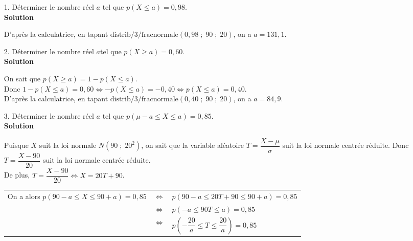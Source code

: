 \begin{itemize}
\item[1.] Déterminer le nombre réel $a$ tel que $p\left(X \leqslant a\right) = 0,98$. \\

\textbf{Solution} 

D'après la calculatrice, en tapant $\mathrm{distrib}/3/\mathrm{fracnormale}\left(0,98 \; ; \; 90 \; ; \; 20\right)$, on a $a = 131,1$. \\

\item[2.] Déterminer le nombre réel $a $tel que $p\left(X \geqslant a\right) = 0,60$. \\

\textbf{Solution} 

On sait que $p\left(X \geqslant a\right) = 1 - p\left(X \leqslant a\right)$. \\

Donc $1 - p\left(X \leqslant a\right) = 0,60 \Longleftrightarrow -p\left(X \leqslant a\right) = -0,40 \Longleftrightarrow p\left(X \leqslant a\right) = 0,40$. \\

D'après la calculatrice, en tapant $\mathrm{distrib}/3/\mathrm{fracnormale}\left(0,40 \; ; \; 90 \; ; \; 20\right)$, on a $a = 84,9$. \\

\item[3.] Déterminer le nombre réel $a$ tel que $p\left(\mu - a\leqslant X \leqslant a\right) = 0,85$. \\

\textbf{Solution} 

Puisque $X$ suit la loi normale $N\left(90 \; ; \; 20^2\right)$, on sait que la variable aléatoire $T = \dfrac{X - \mu}{\sigma}$ suit la loi normale centrée réduite. Donc $T = \dfrac{X - 90}{20}$ suit la loi normale centrée réduite. \\

De plus, $T = \dfrac{X - 90}{20} \Longleftrightarrow X = 20T + 90$. \\

\begin{tabular}{lll}
\hspace{-.3cm} On a alors $p\left(90 - a \leqslant X \leqslant 90 + a\right) = 0,85$ & $\Longleftrightarrow$ & $p\left(90 - a \leqslant 20T + 90 \leqslant 90 + a\right) = 0,85$ \vspace*{.3cm} \\
& $\Longleftrightarrow$ & $p\left(-a \leqslant 90T \leqslant a \right) = 0,85$ \vspace*{.3cm} \\
& $\Longleftrightarrow$ & $p\left(-\dfrac{20}{a} \leqslant T \leqslant \dfrac{20}{a}\right) = 0,85$ \\
\end{tabular}


\end{itemize}
